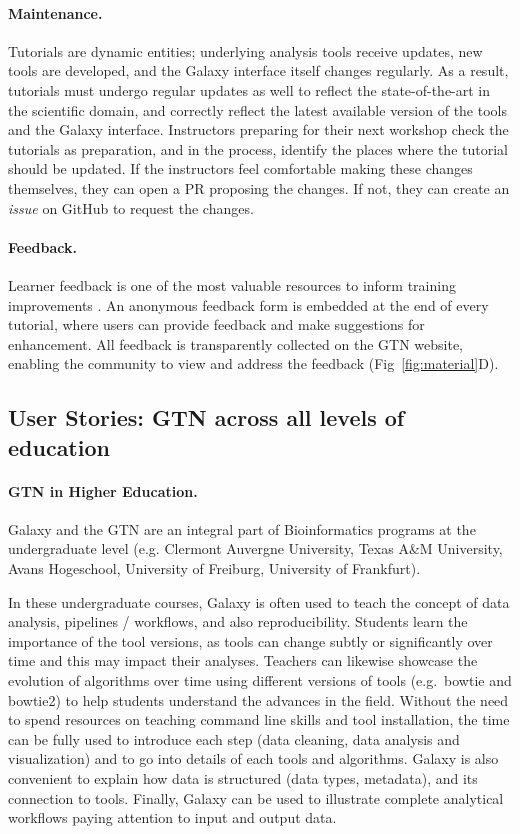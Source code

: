 \paragraph{Maintenance.}
Tutorials are dynamic entities; underlying analysis tools receive updates, new tools are developed, and the Galaxy interface itself changes regularly.
As a result, tutorials must undergo regular updates as well to reflect the state-of-the-art in the scientific domain, and correctly reflect the latest available version of the tools and the Galaxy interface. Instructors preparing for their next workshop check the tutorials as preparation, and in the process, identify the places where the tutorial should be updated. If the instructors feel comfortable making these changes themselves, they can open a PR proposing the changes. If not, they can create an \emph{issue} on GitHub to request the changes.

\paragraph{Feedback.}
Learner feedback is one of the most valuable resources to inform training improvements \cite{ahea2016value}.
An anonymous feedback form is embedded at the end of every tutorial, where users can provide feedback and make suggestions for enhancement. All feedback is transparently collected on the GTN website, enabling the community to view and address the feedback (Fig~\ref{fig:material}D).

\subsection*{User Stories: GTN across all levels of education}\label{sec:userstories}


\paragraph{GTN in Higher Education.}
Galaxy and the GTN are an integral part of Bioinformatics programs at the undergraduate level (e.g. Clermont Auvergne University, Texas A\&M University, Avans Hogeschool, University of Freiburg, University of Frankfurt). 

In these undergraduate courses, Galaxy is often used to teach the concept of data analysis, pipelines / workflows, and also reproducibility. Students learn the importance of the tool versions, as tools can change subtly or significantly over time and this may impact their analyses. Teachers can likewise showcase the evolution of algorithms over time using different versions of tools (e.g.\ bowtie and bowtie2) to help students understand the advances in the field. 
Without the need to spend resources on teaching command line skills and tool installation, the time can be fully used to introduce each step (data cleaning, data analysis and visualization) and to go into details of each tools and algorithms. Galaxy is also convenient to explain how data is structured (data types, metadata), and its connection to tools. Finally, Galaxy can be used to illustrate complete analytical workflows paying attention to input and output data.

